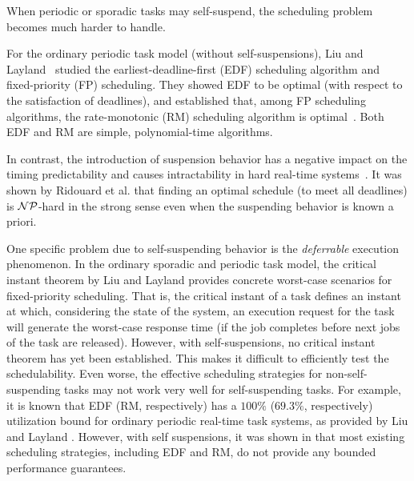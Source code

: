 
When  periodic or sporadic tasks may self-suspend, the scheduling problem becomes much harder to handle. 

For the ordinary periodic task model (without self-suspensions), Liu and Layland~ \cite{Liu_1973} studied the earliest-deadline-first (EDF) scheduling algorithm and fixed-priority (FP) scheduling. They showed EDF to be optimal (with respect to the satisfaction of deadlines), and established that, among FP scheduling algorithms, the rate-monotonic (RM) scheduling algorithm is optimal~\cite{Liu_1973}. Both EDF and RM are simple, polynomial-time algorithms. 

In contrast, the introduction of suspension behavior has a negative impact on the timing predictability and causes intractability in hard real-time systems~\cite{Ridouard_2004}. It was shown by Ridouard et al. \cite{Ridouard_2004} that finding an optimal schedule (to meet all deadlines) is ${\cal NP}$-hard in the strong sense even when the suspending behavior is known a priori.


One specific problem due to self-suspending behavior is the \emph{deferrable} execution phenomenon. In the ordinary sporadic and periodic task model, the critical instant theorem by Liu and Layland \cite{Liu_1973} provides concrete worst-case scenarios for fixed-priority scheduling.  That is, the critical instant of a task defines an instant at which, considering the state of the system, an execution request for the task will generate the worst-case response time (if the job completes before next jobs of the task are released).
However, with self-suspensions, no critical instant theorem has yet been established. This makes it difficult to efficiently test the schedulability. Even worse, the effective scheduling strategies for non-self-suspending tasks may not work very well for self-suspending tasks.
For example, it is known that EDF (RM, respectively) has a $100\%$ ($69.3\%$, respectively) utilization bound for ordinary periodic real-time task systems, as provided by Liu and Layland \cite{Liu_1973}. However, with self suspensions,  it was shown in \cite{Ridouard_2004,RTSS-ChenL14} that most existing scheduling strategies, including EDF and RM, do not  provide any bounded performance guarantees. 

